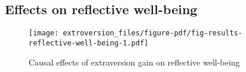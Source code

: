 \documentclass[
  singlecolumn]{report}
\begin{document}
\hypertarget{effects-on-reflective-well-being}{%
\subsection{Effects on reflective
well-being}\label{effects-on-reflective-well-being}}

\begin{figure}

{\centering \texttt{[image: extroversion\_files/figure-pdf/fig-results-reflective-well-being-1.pdf]}

}

\caption{\label{fig-results-reflective-well-being}Causal effects of
extraversion gain on reflective well-being}

\end{figure}

\hypertarget{tbl-results-reflective}{}
\end{document}
